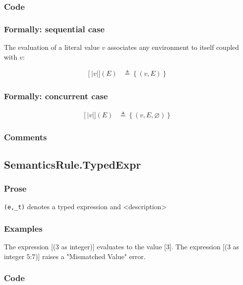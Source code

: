 \documentclass{book}
\newcommand\llbracket{[|}
\newcommand\rrbracket{|]}
\newcommand\interp[1]{\left\llbracket #1 \right\rrbracket}
\begin{document}
  \subsubsection{Code}

  \subsubsection{Formally: sequential case}
  The evaluation of a literal value $v$ associates any environment to itself
  coupled with $v$: 

  \begin{align}
  \interp{v} (E) & \triangleq \left\{ (v, E) \right\}
  \label{eq:sem-det-lit}
  \end{align}

  \subsubsection{Formally: concurrent case}
  \begin{align}
  \interp{v} (E) & \triangleq \left\{ (v, E, \varnothing) \right\}
  \label{eq:sem-ndet-lit}
  \end{align}

  \subsubsection{Comments}

\subsection{SemanticsRule.TypedExpr \label{sec:SemanticsRule.TypedExpr}}

  \subsubsection{Prose}
  \texttt{(e,\_t)} denotes a typed expression and <description>

  \subsubsection{Examples}
  The expression [(3 as integer)] evaluates to the value [3].
  The expression [(3 as integer {5:7})] raises a "Mismatched Value" error.

  \subsubsection{Code}
\end{document}
